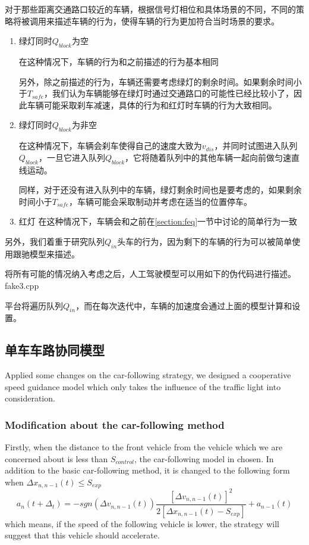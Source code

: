 \documentclass[a4paper,UTF8]{paper}
\begin{document}
对于那些距离交通路口较近的车辆，根据信号灯相位和具体场景的不同，不同的策略将被调用来描述车辆的行为，使得车辆的行为更加符合当时场景的要求。

\begin{enumerate}
\item 绿灯同时$Q_{block}$为空

在这种情况下，车辆的行为和之前描述的行为基本相同

另外，除之前描述的行为，车辆还需要考虑绿灯的剩余时间。如果剩余时间小于$T_{safe}$，我们认为车辆能够在绿灯时通过交通路口的可能性已经比较小了，因此车辆可能采取刹车减速，具体的行为和红灯时车辆的行为大致相同。

\item 绿灯同时$Q_{block}$为非空

在这种情况下，车辆会刹车使得自己的速度大致为$v_{dis}$，并同时试图进入队列$Q_{block}$，一旦它进入队列$Q_{block}$，它将随着队列中的其他车辆一起向前做匀速直线运动。

同样，对于还没有进入队列中的车辆，绿灯剩余时间也是要考虑的，如果剩余时间小于$T_{safe}$，车辆可能会采取制动并考虑在适当的位置停车。

\item 红灯
在这种情况下，车辆会和之前在\ref{section:feq}一节中讨论的简单行为一致
\end{enumerate}

另外，我们着重于研究队列$Q_{in}$头车的行为，因为剩下的车辆的行为可以被简单使用跟驰模型来描述。

将所有可能的情况纳入考虑之后，人工驾驶模型可以用如下的伪代码进行描述。\\
 
 {fake3.cpp}

平台将遍历队列$Q_{in}$，而在每次迭代中，车辆的加速度会通过上面的模型计算和设置。

\subsection{单车车路协同模型}
\label{section:st1}
Applied some changes on the car-following strategy, we designed a cooperative speed guidance model which only takes the influence of the traffic light into consideration.
\subsubsection{Modification about the car-following method}
Firstly, when the distance to the front vehicle from the vehicle which we are concerned about is less than $S_{control}$, the car-following model in chosen. In addition to the basic car-following method, it is changed to the following form when $\Delta x_{n,n-1}(t)\le S_{exp}$ 
$$a_n(t+\Delta_t)=-sgn(\Delta v_{n,n-1}(t))\frac{[\Delta v_{n,n-1}(t)]^2}{2[\Delta x_{n,n-1}(t)-S_{exp}]}+a_{n-1}(t)$$
which means, if the speed of the following vehicle is lower, the strategy will suggest that this vehicle should accelerate.
\end{document}
